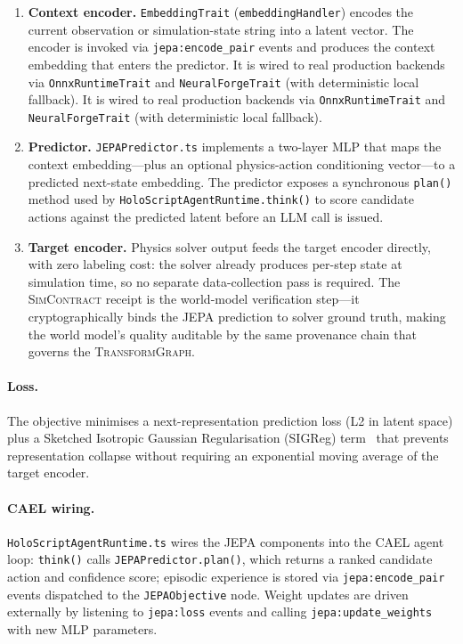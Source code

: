 \documentclass[sigconf,nonacm]{acmart}
\newcommand{\transformgraph}{\textsc{TransformGraph}}
\newcommand{\simcontract}{\textsc{SimContract}}
\begin{document}
\begin{enumerate}
  \item \textbf{Context encoder.}  \texttt{EmbeddingTrait}
    (\texttt{embeddingHandler}) encodes the current observation or
    simulation-state string into a latent vector.  The encoder is
    invoked via \texttt{jepa:encode\_pair} events and produces the
    context embedding that enters the predictor.  It is wired to real
    production backends via \texttt{OnnxRuntimeTrait} and
    \texttt{NeuralForgeTrait} (with deterministic local fallback).  It is wired to real
    production backends via \texttt{OnnxRuntimeTrait} and
    \texttt{NeuralForgeTrait} (with deterministic local fallback).
  \item \textbf{Predictor.}  \texttt{JEPAPredictor.ts} implements a
    two-layer MLP that maps the context embedding---plus an optional
    physics-action conditioning vector---to a predicted next-state
    embedding.  The predictor exposes a synchronous \texttt{plan()}
    method used by \texttt{HoloScriptAgentRuntime.think()} to score
    candidate actions against the predicted latent before an LLM call
    is issued.
  \item \textbf{Target encoder.}  Physics solver output feeds the
    target encoder directly, with zero labeling cost: the solver
    already produces per-step state at simulation time, so no separate
    data-collection pass is required.  The \simcontract{} receipt is
    the world-model verification step---it cryptographically binds the
    JEPA prediction to solver ground truth, making the world model's
    quality auditable by the same provenance chain that governs the
    \transformgraph{}.
\end{enumerate}

\paragraph{Loss.}
The objective minimises a next-representation prediction loss (L2 in
latent space) plus a Sketched Isotropic Gaussian Regularisation (SIGReg)
term~\cite{maes-lewm2024} that prevents representation collapse without
requiring an exponential moving average of the target encoder.

\paragraph{CAEL wiring.}
\texttt{HoloScriptAgentRuntime.ts} wires the JEPA components into the
CAEL agent loop: \texttt{think()} calls \texttt{JEPAPredictor.plan()},
which returns a ranked candidate action and confidence score;
episodic experience is stored via \texttt{jepa:encode\_pair} events
dispatched to the \texttt{JEPAObjective} node.  Weight updates are
driven externally by listening to \texttt{jepa:loss} events and calling
\texttt{jepa:update\_weights} with new MLP parameters.
\end{document}
